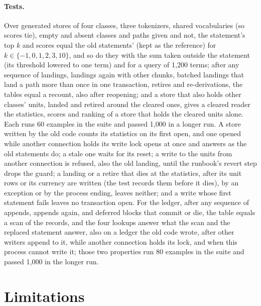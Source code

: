 \documentclass[11pt]{article}
\theoremstyle{plain}
\theoremstyle{definition}
\theoremstyle{remark}
\begin{document}
\paragraph{Tests.} Over generated stores of four classes, three tokenizers, shared vocabularies
(so scores tie), empty and absent classes and paths given and not, the statement's top $k$ and
scores equal the old statements' (kept as the reference) for $k \in \{-1, 0, 1, 2, 3, 10\}$, and
so do they with the sum taken outside the statement (its threshold lowered to one term) and for a
query of 1{,}200 terms; after any sequence of landings, landings again with other chunks, batched
landings that land a path more than once in one transaction, retires and re-derivations, the
tables equal a recount, also after reopening; and a store that also holds other classes' units,
landed and retired around the cleared ones, gives a cleared reader the statistics, scores and
ranking of a store that holds the cleared units alone. Each runs 60 examples in the suite and
passed 1{,}000 in a longer run. A store written by the old code counts its statistics on its
first open, and one
opened while another connection holds its write lock opens at once and answers as the old
statements do; a stale one waits for its reset; a write to the units from another connection is
refused, also the old landing, until the runbook's revert step drops the guard; a landing or a
retire that dies at the statistics, after its unit rows or its currency are written (the test
records them before it dies), by an exception or by the process ending, leaves neither; and a write
whose first statement fails leaves no transaction open. For the ledger, after any sequence of
appends, appends again, and deferred blocks that commit or die, the table equals a scan of the
records, and the four lookups answer what the scan and the replaced statement answer, also on a
ledger the old code wrote, after other writers append to it, while another connection holds its
lock, and when this process cannot write it; those two properties run 80 examples in the suite
and passed 1{,}000 in the longer run.

\section{Limitations}\label{sec:limits}
\end{document}
